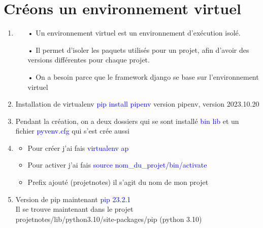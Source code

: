 \documentclass[10pt,a4paper]{article}
\begin{document}
\section{Créons un environnement virtuel }
\begin{enumerate}
\item
\begin{itemize}
\item[]
\item[•]Un environnement virtuel est un environnement d'exécution isolé. 
\item[•]Il permet d'isoler les paquets utilisés pour un projet, afin d'avoir des versions différentes pour chaque projet.
\item[•] On a besoin parce que le framework django se base sur l'environnement virtuel
\end{itemize}

\item Installation de virtualenv \textcolor{blue}{pip install pipenv} version pipenv, version 2023.10.20
\item Pendant la création, on a deux dossiers qui se sont installé \textcolor{blue}{bin  lib} et un fichier \textcolor{blue}{pyvenv.cfg} qui s'est crée aussi


\item
\begin{itemize}
\item[]
\item Pour créer j'ai fais \textcolor{blue}{virtualenv ap}
\item Pour activer j'ai fais \textcolor{blue}{source nom\_du\_projet/bin/activate}
\item Prefix ajouté (projetnotes) il s'agit du nom de mon projet
\end{itemize}
\item Version de pip maintenant \textcolor{blue}{pip 23.2.1}\\
Il se trouve maintenant dans le projet\\
projetnotes/lib/python3.10/site-packages/pip (python 3.10)
\end{enumerate}
\end{document}
